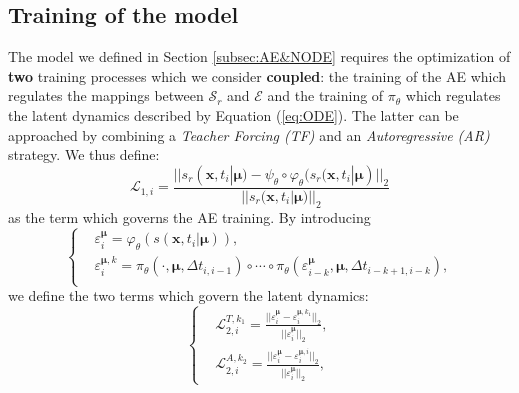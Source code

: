 \subsection{Training of the model}
\label{subsec:training}
The model we defined in Section \ref{subsec:AE&NODE} requires the optimization of \textbf{two} training processes which we consider \textbf{coupled}: the training of the AE which regulates the mappings between $\mathcal{S}_r$ and $\mathcal{E}$ and the training of $\pi_\theta$ which regulates the latent dynamics described by Equation (\ref{eq:ODE}). The latter can be approached by combining a \textit{Teacher Forcing (TF)} and an \textit{Autoregressive (AR)} strategy. We thus define: 
\begin{equation}
    \mathcal{L}_{1,i} = \frac{||s_r(\mathbf{x},t_i|\pmb{\mu})-\psi_\theta\circ\varphi_\theta(s_r(\mathbf{x},t_i|\pmb{\mu})||_2}{||s_r(\mathbf{x},t_i|\pmb{\mu})||_2}
\end{equation}
as the term which governs the AE training. By introducing
\begin{equation}
    \left\{
    \begin{aligned}
    &\varepsilon_i^{\pmb{\mu}} = \varphi_\theta(s(\mathbf{x},t_i|\pmb{\mu})),\\
    &\varepsilon_{i}^{\pmb{\mu},k} = \pi_\theta(\cdot,\pmb{\mu},\Delta t_{i,i-1})\circ\cdots\circ\pi_\theta(\varepsilon_{i-k}^{\pmb{\mu}},\pmb{\mu},\Delta t_{i-k+1,i-k}), \\
    \end{aligned}
    \right.
\label{eq:notation_simplified}
\end{equation}
we define the two terms which govern the latent dynamics:
\begin{equation}
    \left\{
    \begin{aligned}
    &\mathcal{L}_{2,i}^{T,k_1} = \frac{||\varepsilon_i^{\pmb{\mu}}-\varepsilon_{i}^{\pmb{\mu},k_1}||_2}{||\varepsilon_i^{\pmb{\mu}}||_2},\\
    &\mathcal{L}_{2,i}^{A,k_2} =  \frac{||\varepsilon_i^{\pmb{\mu}}-\varepsilon_i^{\pmb{\mu},i}||_2}{||\varepsilon_i^{\pmb{\mu}}||_2},
    \end{aligned}
    \right.
\label{eq:L2_loss}
\end{equation}
